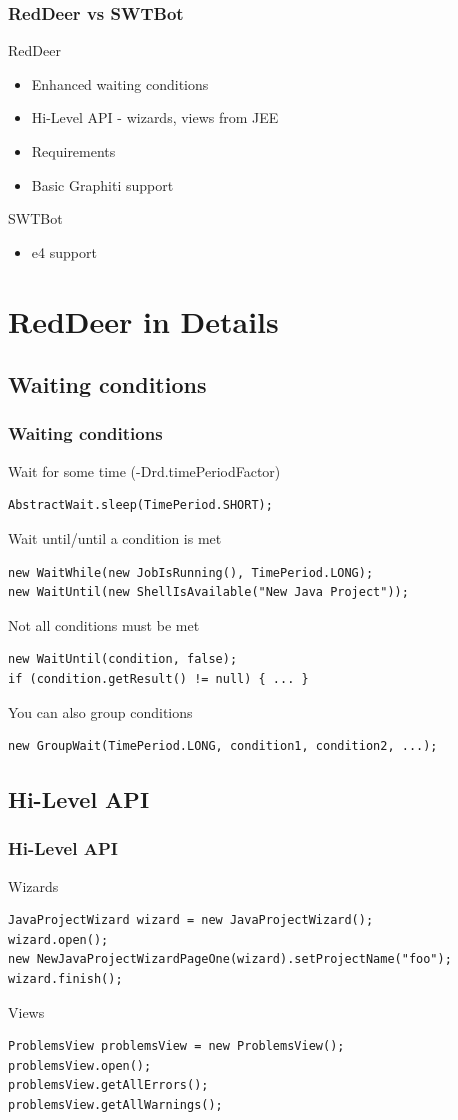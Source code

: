 \documentclass{beamer}
\begin{document}
\begin{frame}[fragile]
\frametitle{RedDeer vs SWTBot}
RedDeer
\begin{itemize}
\item Enhanced waiting conditions
\item Hi-Level API - wizards, views from JEE
\item Requirements
\item Basic Graphiti support
\end{itemize}
\vspace{0.5cm}
SWTBot
\begin{itemize}
\item e4 support
\end{itemize}
\end{frame}

\section{RedDeer in Details}

\subsection{Waiting conditions}
\begin{frame}[fragile]
\frametitle{Waiting conditions}
Wait for some time (-Drd.timePeriodFactor)
\begin{lstlisting}
AbstractWait.sleep(TimePeriod.SHORT);
\end{lstlisting}
\pause
Wait until/until a condition is met
\begin{lstlisting}
new WaitWhile(new JobIsRunning(), TimePeriod.LONG);
new WaitUntil(new ShellIsAvailable("New Java Project"));
\end{lstlisting}
\pause
Not all conditions must be met
\begin{lstlisting}
new WaitUntil(condition, false);
if (condition.getResult() != null) { ... }
\end{lstlisting}
\pause
You can also group conditions
\begin{lstlisting}
new GroupWait(TimePeriod.LONG, condition1, condition2, ...);
\end{lstlisting}
\end{frame}

\subsection{Hi-Level API}
\begin{frame}[fragile]
\frametitle{Hi-Level API}
\pause
Wizards
\begin{lstlisting}
JavaProjectWizard wizard = new JavaProjectWizard();
wizard.open();
new NewJavaProjectWizardPageOne(wizard).setProjectName("foo");
wizard.finish();
\end{lstlisting}
\vspace{0.5cm}
\pause
Views
\begin{lstlisting}
ProblemsView problemsView = new ProblemsView();
problemsView.open();
problemsView.getAllErrors();
problemsView.getAllWarnings();
\end{lstlisting}
\end{frame}
\end{document}
